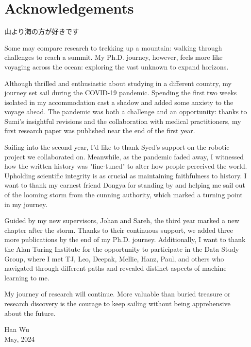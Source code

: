 \chapter*{Acknowledgements}

\begin{CJK*}{UTF8}{goth}
\noindent 山より海の方が好きです
\end{CJK*}

\vspace{0.3cm}

\noindent Some may compare research to trekking up a mountain: walking through challenges to reach a summit. My Ph.D. journey, however, feels more like voyaging across the ocean: exploring the vast unknown to expand horizons.

\vspace{0.3cm}

\noindent Although thrilled and enthusiastic about studying in a different country, my journey set sail during the COVID-19 pandemic. Spending the first two weeks isolated in my accommodation cast a shadow and added some anxiety to the voyage ahead. The pandemic was both a challenge and an opportunity: thanks to Sumi's insightful revisions and the collaboration with medical practitioners, my first research paper was published near the end of the first year.

\vspace{0.3cm}

\noindent Sailing into the second year, I'd like to thank Syed's support on the robotic project we collaborated on. Meanwhile, as the pandemic faded away, I witnessed how the written history was "fine-tuned" to alter how people perceived the world. Upholding scientific integrity is as crucial as maintaining faithfulness to history. I want to thank my earnest friend Dongya for standing by and helping me sail out of the looming storm from the cunning authority, which marked a turning point in my journey. 

\vspace{0.3cm}

\noindent Guided by my new supervisors, Johan and Sareh, the third year marked a new chapter after the storm. Thanks to their continuous support, we added three more publications by the end of my Ph.D. journey. Additionally, I want to thank the Alan Turing Institute for the opportunity to participate in the Data Study Group, where I met TJ, Leo, Deepak, Mellie, Hanz, Paul, and others who navigated through different paths and revealed distinct aspects of machine learning to me.

\vspace{0.3cm}

\noindent My journey of research will continue. More valuable than buried treasure or research discovery is the courage to keep sailing without being apprehensive about the future.

\vspace{0.5cm}

\raggedleft
{\normalsize \textup{Han Wu}\\ May, 2024}

\justifying
